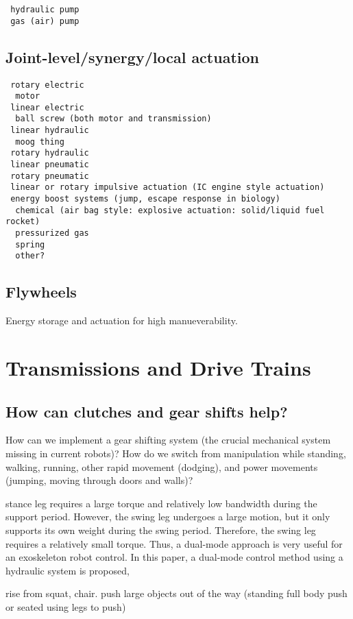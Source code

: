 \documentclass[letterpaper,12pt,fullpage]{article}
\begin{document}
\begin{verbatim}
 hydraulic pump 
 gas (air) pump
\end{verbatim}

\subsection{Joint-level/synergy/local actuation}

\begin{verbatim}
 rotary electric
  motor
 linear electric
  ball screw (both motor and transmission)
 linear hydraulic
  moog thing
 rotary hydraulic
 linear pneumatic
 rotary pneumatic
 linear or rotary impulsive actuation (IC engine style actuation)
 energy boost systems (jump, escape response in biology)
  chemical (air bag style: explosive actuation: solid/liquid fuel rocket)
  pressurized gas
  spring
  other?
\end{verbatim}

\subsection{Flywheels}

Energy storage and actuation for high manueverability.

\section{Transmissions and Drive Trains}

\subsection{How can clutches and gear shifts help?}

How can we implement a gear shifting system (the crucial mechanical
system missing in current robots)? How do we switch from manipulation
while standing, walking, running, other rapid movement (dodging), and
power movements (jumping, moving through doors and walls)?

stance leg requires a large torque and
relatively low bandwidth during the support period. However,
the swing leg undergoes a large motion, but it only supports
its own weight during the swing period. Therefore, the swing
leg requires a relatively small torque. Thus, a dual-mode
approach is very useful for an exoskeleton robot control.
In this paper, a dual-mode control method using a hydraulic
system is proposed,~\cite{IEEE07222598}

rise from squat, chair.
push large objects out of the way (standing full body push
or seated using legs to push)
\end{document}
